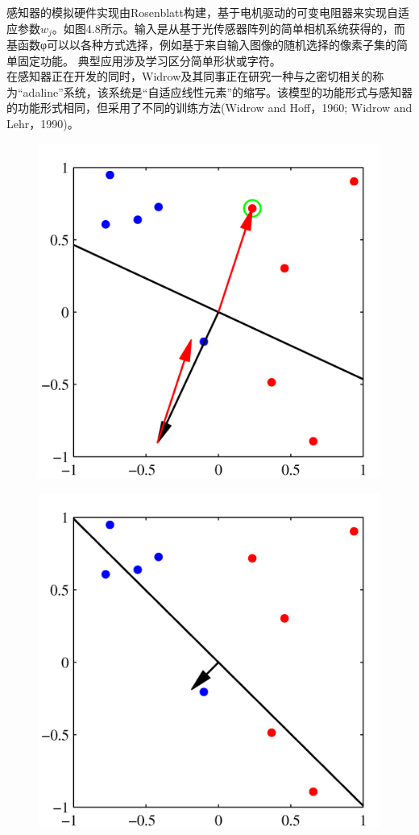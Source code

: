 \documentclass[b5paper]{book}
\numberwithin{equation}{chapter}
\begin{document}
{	\indent 感知器的模拟硬件实现由Rosenblatt构建，基于电机驱动的可变电阻器来实现自适应参数$w_j$。如图4.8所示。输入是从基于光传感器阵列的简单相机系统获得的，而基函数φ可以以各种方式选择，例如基于来自输入图像的随机选择的像素子集的简单固定功能。 典型应用涉及学习区分简单形状或字符。\\
	\indent 在感知器正在开发的同时，Widrow及其同事正在研究一种与之密切相关的称为“adaline”系统，该系统是“自适应线性元素”的缩写。该模型的功能形式与感知器的功能形式相同，但采用了不同的训练方法(Widrow and Hoff，1960; Widrow and Lehr，1990)。
	\begin{figure}[H]
		\begin{minipage}[t]{0.5\linewidth}
		\centering
		\includegraphics[scale=0.8]{Images/4-7a.png}
		\label{fig:4-7a}
		\end{minipage}
		\begin{minipage}[t]{0.5\linewidth}
		\centering
		\includegraphics[scale=0.8]{Images/4-7b.png}

\end{minipage}
\end{figure}}
\end{document}
